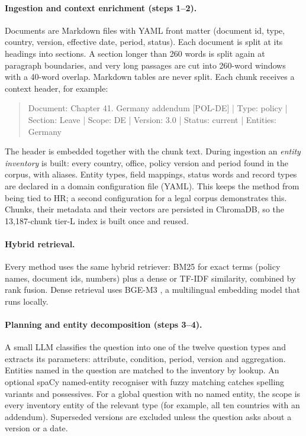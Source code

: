 \documentclass[11pt,letterpaper,oneside]{report}
\begin{document}
\paragraph{Ingestion and context enrichment (steps 1--2).}
Documents are Markdown files with YAML front matter (document id, type,
country, version, effective date, period, status). Each document is split at
its headings into sections. A section longer than 260 words is split again at
paragraph boundaries, and very long passages are cut into 260-word windows
with a 40-word overlap. Markdown tables are never split. Each chunk receives
a context header, for example:
\begin{quote}\small\ttfamily\raggedright
Document: Chapter 41. Germany addendum [POL-DE] | Type: policy | Section:
Leave | Scope: DE | Version: 3.0 | Status: current | Entities: Germany
\end{quote}
The header is embedded together with the chunk text. During ingestion an
\emph{entity inventory} is built: every country, office, policy version and
period found in the corpus, with aliases. Entity types, field mappings,
status words and record types are declared in a domain configuration file
(YAML). This keeps the method from being tied to HR; a second configuration
for a legal corpus demonstrates this. Chunks, their metadata and their
vectors are persisted in ChromaDB, so the 13{,}187-chunk tier-L index is
built once and reused.

\paragraph{Hybrid retrieval.}
Every method uses the same hybrid retriever: BM25 for exact terms (policy
names, document ids, numbers) plus a dense or TF-IDF similarity, combined by
rank fusion. Dense retrieval uses BGE-M3 \citep{chen2024bgem3}, a
multilingual embedding model that runs locally.

\paragraph{Planning and entity decomposition (steps 3--4).}
A small LLM classifies the question into one of the twelve question types and
extracts its parameters: attribute, condition, period, version and
aggregation. Entities named in the question are matched to the inventory by
lookup. An optional spaCy named-entity recogniser with fuzzy matching catches
spelling variants and possessives. For a global question with no named
entity, the scope is every inventory entity of the relevant type (for
example, all ten countries with an addendum). Superseded versions are
excluded unless the question asks about a version or a date.
\end{document}
